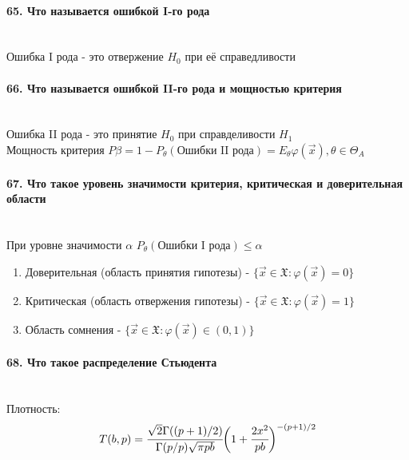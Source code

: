 \documentclass[titlepage]{article}
\newcommand{\sX}{\mathfrak{X}}
\begin{document}
\paragraph{65. Что называется ошибкой I-го рода} ~\\
Ошибка I рода - это отвержение $H_0$ при её справедливости

\paragraph{66. Что называется ошибкой II-го рода и мощностью критерия} ~\\
Ошибка II рода - это принятие $H_0$ при справделивости $H_1$\\
Мощность критерия $P\beta = 1 - P_\theta(\text{Ошибки II рода}) = E_\theta\varphi(\vec x), \theta \in \Theta_A$

\paragraph{67. Что такое уровень значимости критерия, критическая и доверительная области} ~\\
При уровне значимости $\alpha$ $P_\theta(\text{Ошибки I рода}) \leq \alpha$
\begin{enumerate}
	\item Доверительная (область принятия гипотезы) - $\{\vec x \in \sX: \varphi(\vec x) = 0\}$
	\item Критическая (область отвержения гипотезы) - $\{\vec x \in \sX: \varphi(\vec x) = 1\}$
	\item Область сомнения - $\{\vec x \in \sX: \varphi(\vec x) \in (0,1)\}$
\end{enumerate}

\paragraph{68. Что такое распределение Стьюдента} ~\\
Плотность:
\[T(b,p)=\cfrac{\sqrt{2}\Gamma((p+1)/2)}{\Gamma(p/p)\sqrt{\pi p b}}\bigg(1+\cfrac{2x^2}{pb}\bigg)^{-(p+1)/2}\]
\end{document}
